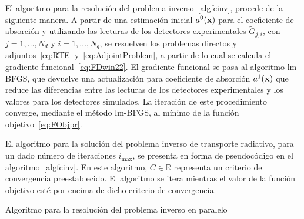 El algoritmo para la resolución del problema inverso~\ref{algfcinv},
procede de la siguiente manera. A partir de una estimación inicial $a^0(\mathbf{x})$ para el
coeficiente de absorción y utilizando las lecturas de los detectores experimentales
$\widetilde{G}_{j,i}$, con $j=1, \ldots,N_d$ y $i=1,\ldots,N_q$, se resuelven
los problemas directos y adjuntos~\eqref{eq:RTE}
y~\eqref{eq:AdjointProblem}, a partir de lo cual se calcula el gradiente 
funcional~\eqref{eq:FDwin22}. El gradiente funcional 
se pasa al algoritmo lm-BFGS, que devuelve una actualización para 
coeficiente de absorción $a^1(\mathbf{x})$ que reduce las diferencias entre
las lecturas de los detectores experimentales y los valores para los detectores simulados.
La iteración de este procedimiento converge, mediante el método lm-BFGS, al mínimo 
de la función objetivo~\eqref{eq:FObjpr}.

El algoritmo para la solución del problema inverso de transporte radiativo, 
para un dado número de iteraciones $i_{\text{max}}$, se presenta en forma de pseudocódigo en el 
algoritmo~\ref{algfcinv}. En este algoritmo, $C \in \mathbb{R}$ representa un criterio 
de convergencia preestablecido. El algoritmo se itera mientras el valor 
de la función objetivo esté por encima de dicho criterio de convergencia.
\begin{algorithm}
\caption{Algoritmo para la resolución del problema inverso en paralelo}
\label{algfcinv}
\end{algorithm}


